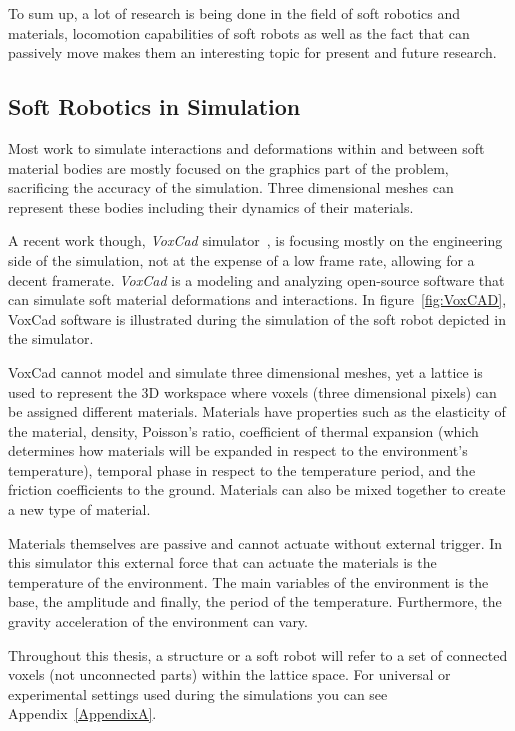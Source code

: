 To sum up, a lot of research is being done in the field of soft robotics and materials, locomotion capabilities of soft robots as well as the fact that can passively move makes them an interesting topic for present and future research.


\subsection{Soft Robotics in Simulation}

Most work to simulate interactions and deformations within and between soft material bodies are mostly focused on the graphics part of the problem, sacrificing the accuracy of the simulation. Three dimensional meshes can represent these bodies including their dynamics of their materials. 

A recent work though, \emph{VoxCad} simulator~\cite{hiller2012dynamic}, is focusing mostly on the engineering side of the simulation, not at the expense of a low frame rate, allowing for a decent framerate. \emph{VoxCad} is a modeling and analyzing open-source software that can simulate soft material deformations and interactions. In figure~\ref{fig:VoxCAD}, VoxCad software is illustrated during the simulation of the soft robot depicted in the simulator.

VoxCad cannot model and simulate three dimensional meshes, yet a lattice is used to represent the 3D workspace where voxels (three dimensional pixels) can be assigned different materials. Materials have properties such as the elasticity of the material, density, Poisson's ratio, coefficient of thermal expansion (which determines how materials will be expanded in respect to the environment's temperature), temporal phase in respect to the temperature period, and the friction coefficients to the ground. Materials can also be mixed together to create a new type of material.

Materials themselves are passive and cannot actuate without external trigger. In this simulator this external force that can actuate the materials is the temperature of the environment. The main variables of the environment is the base, the amplitude and finally, the period of the temperature. Furthermore, the gravity acceleration of the environment can vary.

Throughout this thesis, a structure or a soft robot will refer to a set of connected voxels (not unconnected parts) within the lattice space. For universal or experimental settings used during the simulations you can see Appendix~\ref{AppendixA}.



